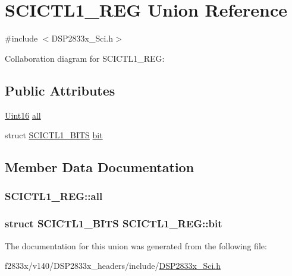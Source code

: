 \hypertarget{union_s_c_i_c_t_l1___r_e_g}{}\section{S\+C\+I\+C\+T\+L1\+\_\+\+R\+E\+G Union Reference}
\label{union_s_c_i_c_t_l1___r_e_g}


{\ttfamily \#include $<$D\+S\+P2833x\+\_\+\+Sci.\+h$>$}



Collaboration diagram for S\+C\+I\+C\+T\+L1\+\_\+\+R\+E\+G\+:
\subsection*{Public Attributes}
\begin{DoxyCompactItemize}
\item 
\hyperlink{_d_s_p2833x___device_8h_a59a9f6be4562c327cbfb4f7e8e18f08b}{Uint16} \hyperlink{union_s_c_i_c_t_l1___r_e_g_a10d67e17c0e836cd554f6b8b0691717f}{all}
\item 
struct \hyperlink{struct_s_c_i_c_t_l1___b_i_t_s}{S\+C\+I\+C\+T\+L1\+\_\+\+B\+I\+T\+S} \hyperlink{union_s_c_i_c_t_l1___r_e_g_a67bbff8cb4b51339444a7e9f04a78ea2}{bit}
\end{DoxyCompactItemize}


\subsection{Member Data Documentation}
\hypertarget{union_s_c_i_c_t_l1___r_e_g_a10d67e17c0e836cd554f6b8b0691717f}{}
\subsubsection[{all}]{ S\+C\+I\+C\+T\+L1\+\_\+\+R\+E\+G\+::all}\label{union_s_c_i_c_t_l1___r_e_g_a10d67e17c0e836cd554f6b8b0691717f}
\hypertarget{union_s_c_i_c_t_l1___r_e_g_a67bbff8cb4b51339444a7e9f04a78ea2}{}
\subsubsection[{bit}]{\setlength{\rightskip}{0pt plus 5cm}struct {\bf S\+C\+I\+C\+T\+L1\+\_\+\+B\+I\+T\+S} S\+C\+I\+C\+T\+L1\+\_\+\+R\+E\+G\+::bit}\label{union_s_c_i_c_t_l1___r_e_g_a67bbff8cb4b51339444a7e9f04a78ea2}


The documentation for this union was generated from the following file\+:\begin{DoxyCompactItemize}
\item 
f2833x/v140/\+D\+S\+P2833x\+\_\+headers/include/\hyperlink{_d_s_p2833x___sci_8h}{D\+S\+P2833x\+\_\+\+Sci.\+h}\end{DoxyCompactItemize}
